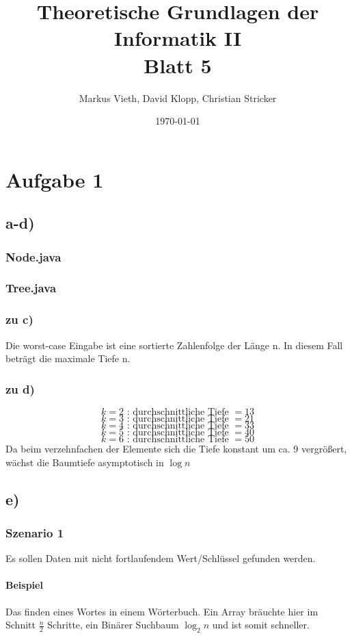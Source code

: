 \documentclass[a4paper,11pt,twoside]{article}
\title{Theoretische Grundlagen der Informatik II\\ Blatt 5}
\author{Markus Vieth, David Klopp, Christian Stricker}
\date{\today}
\begin{document}
\maketitle
\cleardoublepage
\pagestyle{myheadings}
\section*{Aufgabe 1}
\subsection*{a-d)}
\subsubsection*{Node.java}

\subsubsection*{Tree.java}

\subsubsection*{zu c)}
Die worst-case Eingabe ist eine sortierte Zahlenfolge der Länge n. In diesem Fall beträgt die maximale Tiefe n.
\subsubsection*{zu d)}
\[k = 2 \text{ : durchschnittliche Tiefe }= 13\]
\[k = 3 \text{ : durchschnittliche Tiefe }= 21\]
\[k = 4 \text{ : durchschnittliche Tiefe }= 33\]
\[k = 5 \text{ : durchschnittliche Tiefe }= 40\]
\[k = 6 \text{ : durchschnittliche Tiefe }= 50\]
Da beim verzehnfachen der Elemente sich die Tiefe konstant um ca. 9 vergrößert, wächst die Baumtiefe asymptotisch in $\log n$ 
\subsection*{e)}
\subsubsection*{Szenario 1}
Es sollen Daten mit nicht fortlaufendem Wert/Schlüssel gefunden werden.\\
\paragraph*{Beispiel} Das finden eines Wortes in einem Wörterbuch. Ein Array bräuchte hier im Schnitt $\frac{n}{2}$ Schritte, ein Binärer Suchbaum $\log_2 n$ und ist somit schneller.
\end{document}
